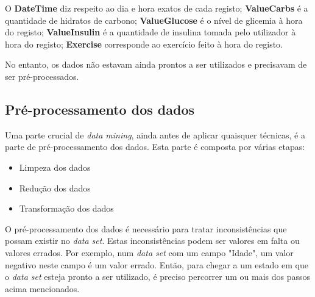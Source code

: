 O \textbf{DateTime} diz respeito ao dia e hora exatos de cada registo;
\textbf{Value\textunderscore Carbs} é a quantidade de hidratos de carbono;
\textbf{Value\textunderscore Glucose} é o nível de glicemia à hora do registo;
\textbf{Value\textunderscore Insulin} é a quantidade de insulina tomada pelo utilizador à hora do registo;
\textbf{Exercise} corresponde ao exercício feito à hora do registo.

No entanto, os dados não estavam ainda prontos a ser utilizados e precisavam de ser pré-processados.

\subsection{Pré-processamento dos dados}

Uma parte crucial de \textit{data mining}, ainda antes de aplicar quaisquer técnicas, é a parte de pré-processamento dos dados. Esta parte é composta por várias etapas:

\begin{itemize}
\item Limpeza dos dados
\item Redução dos dados
\item Transformação dos dados
\end{itemize}
 
O pré-processamento dos dados é necessário para tratar inconsistências que possam existir no \textit{data set}. Estas inconsistências podem ser valores em falta ou valores errados. Por exemplo, num \textit{data set} com um campo "Idade", um valor negativo neste campo é um valor errado. Então, para chegar a um estado em que o \textit{data set} esteja pronto a ser utilizado, é preciso percorrer um ou mais dos passos acima mencionados. 


